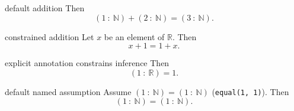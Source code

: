 \begin{cleanresult}{default addition}
Then \[\left(1 \: : \: \mathbb{N}\right)+\left(2 \: : \: \mathbb{N}\right)=\left(3 \: : \: \mathbb{N}\right).\]
\end{cleanresult}

\begin{cleanresult}{constrained addition}
Let $x$ be an element of $\mathbb{R}$.
Then \[x+1=1+x.\]
\end{cleanresult}

\begin{cleanresult}{explicit annotation constrains inference}
Then \[\left(1 \: : \: \mathbb{R}\right)=1.\]
\end{cleanresult}

\begin{cleanresult}{default named assumption}
Assume $\left(1 \: : \: \mathbb{N}\right)=\left(1 \: : \: \mathbb{N}\right)$ (\texttt{equal(1, 1)}).
Then \[\left(1 \: : \: \mathbb{N}\right)=\left(1 \: : \: \mathbb{N}\right).\]
\end{cleanresult}


